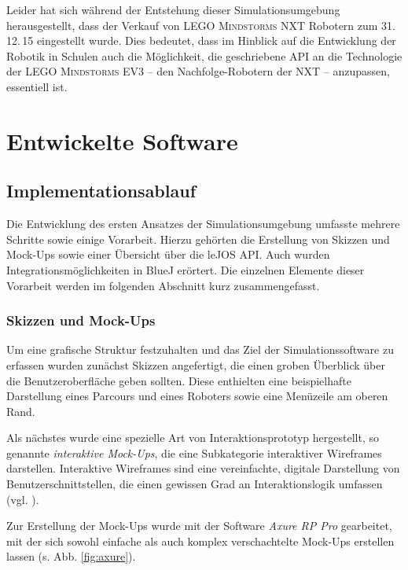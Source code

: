 \documentclass[paper=a4, DIV=calc, BCOR=12mm, twoside=on, onecolumn=on, open = right, titlepage =on, parskip =half-, headsepline = on, footsepline = off, chapterprefix = off, appendixprefix = on, fontsize = 12pt, numbers = noenddot, abstract = on]{scrbook}
\begin{document}
Leider hat sich während der Entstehung dieser Simulationsumgebung herausgestellt, dass der Verkauf von \textsc{LEGO Mindstorms} NXT Robotern zum 31.\,12.\,15 eingestellt wurde. Dies bedeutet, dass im Hinblick auf die Entwicklung der Robotik in Schulen auch die Möglichkeit, die geschriebene API an die Technologie der \textsc{LEGO Mindstorms} EV3 --  den Nachfolge-Robotern der NXT -- anzupassen, essentiell ist.


\par \singlespacing
\chapter{Entwickelte Software}
\onehalfspacing
\par \singlespacing
\section{Implementationsablauf}
\onehalfspacing
Die Entwicklung des ersten Ansatzes der Simulationsumgebung umfasste mehrere Schritte sowie einige Vorarbeit. Hierzu gehörten die Erstellung von Skizzen und Mock-Ups sowie einer Übersicht über die leJOS API. Auch wurden Integrationsmöglichkeiten in BlueJ erörtert. Die einzelnen Elemente dieser Vorarbeit werden im folgenden Abschnitt kurz zusammengefasst. 
\par \singlespacing
\subsection{Skizzen und Mock-Ups} 
\onehalfspacing
Um eine grafische Struktur festzuhalten und das Ziel der Simulationssoftware zu erfassen wurden zunächst Skizzen angefertigt, die einen groben Überblick über die Benutzeroberfläche geben sollten. Diese enthielten eine beispielhafte Darstellung eines Parcours und eines Roboters sowie eine Menüzeile am oberen Rand. 

Als nächstes wurde eine spezielle Art von Interaktionsprototyp hergestellt, so genannte \emph{interaktive Mock-Ups}, die eine Subkategorie interaktiver Wireframes darstellen. Interaktive Wireframes sind eine vereinfachte, digitale Darstellung von Benutzerschnittstellen, die einen gewissen Grad an Interaktionslogik umfassen (vgl. \cite[S.162ff.]{moser:12}).

Zur Erstellung der Mock-Ups wurde mit der Software \emph{Axure RP Pro} gearbeitet, mit der sich sowohl einfache als auch komplex verschachtelte Mock-Ups erstellen lassen (s. Abb. \ref{fig:axure}).
\end{document}
